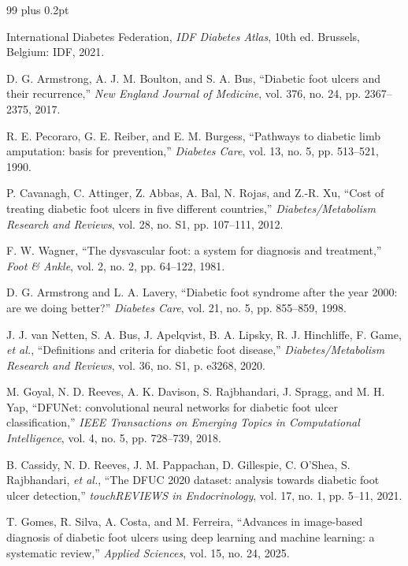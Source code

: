 \begin{thebibliography}{99}
\itemsep0pt plus 0.2pt

International Diabetes Federation, \emph{IDF Diabetes Atlas}, 10th ed.
Brussels, Belgium: IDF, 2021.

D. G. Armstrong, A. J. M. Boulton, and S. A. Bus, ``Diabetic foot ulcers
and their recurrence,'' \emph{New England Journal of Medicine}, vol. 376,
no. 24, pp. 2367--2375, 2017.

R. E. Pecoraro, G. E. Reiber, and E. M. Burgess, ``Pathways to diabetic
limb amputation: basis for prevention,'' \emph{Diabetes Care}, vol. 13,
no. 5, pp. 513--521, 1990.

P. Cavanagh, C. Attinger, Z. Abbas, A. Bal, N. Rojas, and Z.-R. Xu, ``Cost
of treating diabetic foot ulcers in five different countries,''
\emph{Diabetes/Metabolism Research and Reviews}, vol. 28, no. S1,
pp. 107--111, 2012.

F. W. Wagner, ``The dysvascular foot: a system for diagnosis and
treatment,'' \emph{Foot \& Ankle}, vol. 2, no. 2, pp. 64--122, 1981.

D. G. Armstrong and L. A. Lavery, ``Diabetic foot syndrome after the year
2000: are we doing better?'' \emph{Diabetes Care}, vol. 21, no. 5,
pp. 855--859, 1998.

J. J. van Netten, S. A. Bus, J. Apelqvist, B. A. Lipsky, R. J. Hinchliffe,
F. Game, \emph{et al.}, ``Definitions and criteria for diabetic foot
disease,'' \emph{Diabetes/Metabolism Research and Reviews}, vol. 36,
no. S1, p. e3268, 2020.

M. Goyal, N. D. Reeves, A. K. Davison, S. Rajbhandari, J. Spragg, and
M. H. Yap, ``DFUNet: convolutional neural networks for diabetic foot ulcer
classification,'' \emph{IEEE Transactions on Emerging Topics in
Computational Intelligence}, vol. 4, no. 5, pp. 728--739, 2018.

B. Cassidy, N. D. Reeves, J. M. Pappachan, D. Gillespie, C. O'Shea,
S. Rajbhandari, \emph{et al.}, ``The DFUC 2020 dataset: analysis towards
diabetic foot ulcer detection,'' \emph{touchREVIEWS in Endocrinology},
vol. 17, no. 1, pp. 5--11, 2021.

T. Gomes, R. Silva, A. Costa, and M. Ferreira, ``Advances in image-based
diagnosis of diabetic foot ulcers using deep learning and machine learning:
a systematic review,'' \emph{Applied Sciences}, vol. 15, no. 24, 2025.


\end{thebibliography}
